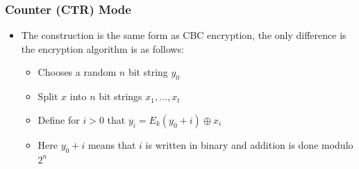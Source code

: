 \subsubsection{Counter (CTR) Mode}
\begin{itemize}
  \item The construction is the same form as CBC encryption, the only difference is the encryption algorithm is as follows:
  \begin{itemize}
  	\item Chooses a random $n$ bit string $y_0$
  	\item Split $x$ into $n$ bit strings $x_1, \dots, x_t$
  	\item Define for $i>0$ that $y_i = E_k(y_0+i) \oplus x_i$
  	\item Here $y_0 +i$ means that $i$ is written in binary and addition is done modulo $2^n$
  \end{itemize}


\end{itemize}
